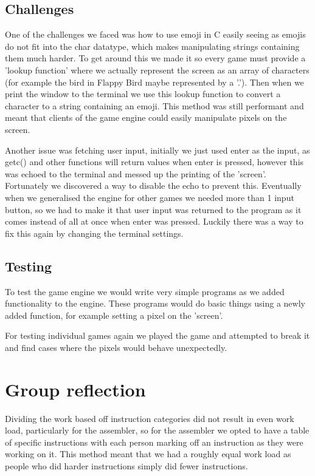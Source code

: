 \documentclass{article}
\begin{document}
\subsection{Challenges}
One of the challenges we faced was how to use emoji in C easily seeing as emojis do not fit into the char datatype, which makes manipulating strings containing them much harder. To get around this we made it so every game must provide a 'lookup function' where we actually represent the screen as an array of characters (for example the bird in Flappy Bird maybe represented by a '.'). Then when we print the window to the terminal we use this lookup function to convert a character to a string containing an emoji. This method was still performant and meant that clients of the game engine could easily manipulate pixels on the screen.

Another issue was fetching user input, initially we just used enter as the input, as getc() and other functions will return values when enter is pressed, however this was echoed to the terminal and messed up the printing of the 'screen'. Fortunately we discovered a way to disable the echo to prevent this. Eventually when we generalised the engine for other games we needed more than 1 input button, so we had to make it that user input was returned to the program as it comes instead of all at once when enter was pressed. Luckily there was a way to fix this again by changing the terminal settings.

\subsection{Testing}
To test the game engine we would write very simple programs as we added functionality to the engine. These programs would do basic things using a newly added function, for example setting a pixel on the 'screen'. 

For testing individual games again we played the game and attempted to break it and find cases where the pixels would behave unexpectedly.

\section{Group reflection}
Dividing the work based off instruction categories did not result in even work load, particularly for the assembler, so for the assembler we opted to have a table of specific instructions with each person marking off an instruction as they were working on it. This method meant that we had a roughly equal work load as people who did harder instructions simply did fewer instructions.
\end{document}
